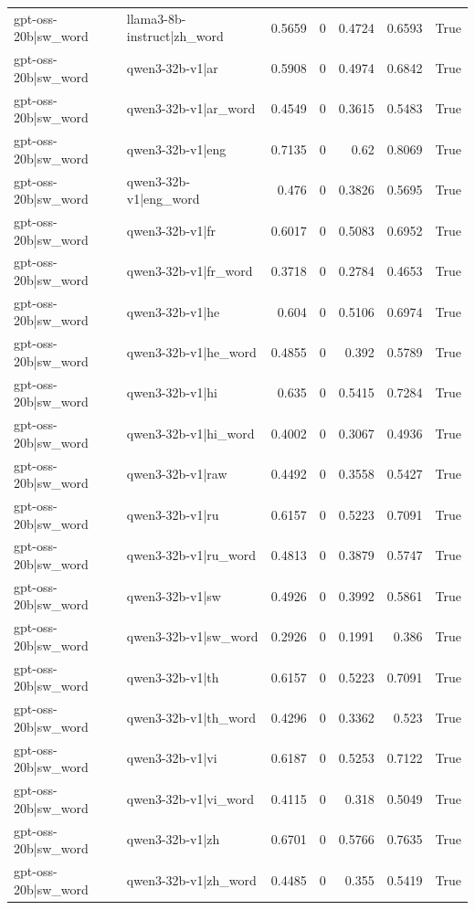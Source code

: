 \begin{table}
\begin{tabular}{l l r r r r l}
gpt-oss-20b|sw_word & llama3-8b-instruct|zh_word & 0.5659 & 0 & 0.4724 & 0.6593 & True \\
gpt-oss-20b|sw_word & qwen3-32b-v1|ar & 0.5908 & 0 & 0.4974 & 0.6842 & True \\
gpt-oss-20b|sw_word & qwen3-32b-v1|ar_word & 0.4549 & 0 & 0.3615 & 0.5483 & True \\
gpt-oss-20b|sw_word & qwen3-32b-v1|eng & 0.7135 & 0 & 0.62 & 0.8069 & True \\
gpt-oss-20b|sw_word & qwen3-32b-v1|eng_word & 0.476 & 0 & 0.3826 & 0.5695 & True \\
gpt-oss-20b|sw_word & qwen3-32b-v1|fr & 0.6017 & 0 & 0.5083 & 0.6952 & True \\
gpt-oss-20b|sw_word & qwen3-32b-v1|fr_word & 0.3718 & 0 & 0.2784 & 0.4653 & True \\
gpt-oss-20b|sw_word & qwen3-32b-v1|he & 0.604 & 0 & 0.5106 & 0.6974 & True \\
gpt-oss-20b|sw_word & qwen3-32b-v1|he_word & 0.4855 & 0 & 0.392 & 0.5789 & True \\
gpt-oss-20b|sw_word & qwen3-32b-v1|hi & 0.635 & 0 & 0.5415 & 0.7284 & True \\
gpt-oss-20b|sw_word & qwen3-32b-v1|hi_word & 0.4002 & 0 & 0.3067 & 0.4936 & True \\
gpt-oss-20b|sw_word & qwen3-32b-v1|raw & 0.4492 & 0 & 0.3558 & 0.5427 & True \\
gpt-oss-20b|sw_word & qwen3-32b-v1|ru & 0.6157 & 0 & 0.5223 & 0.7091 & True \\
gpt-oss-20b|sw_word & qwen3-32b-v1|ru_word & 0.4813 & 0 & 0.3879 & 0.5747 & True \\
gpt-oss-20b|sw_word & qwen3-32b-v1|sw & 0.4926 & 0 & 0.3992 & 0.5861 & True \\
gpt-oss-20b|sw_word & qwen3-32b-v1|sw_word & 0.2926 & 0 & 0.1991 & 0.386 & True \\
gpt-oss-20b|sw_word & qwen3-32b-v1|th & 0.6157 & 0 & 0.5223 & 0.7091 & True \\
gpt-oss-20b|sw_word & qwen3-32b-v1|th_word & 0.4296 & 0 & 0.3362 & 0.523 & True \\
gpt-oss-20b|sw_word & qwen3-32b-v1|vi & 0.6187 & 0 & 0.5253 & 0.7122 & True \\
gpt-oss-20b|sw_word & qwen3-32b-v1|vi_word & 0.4115 & 0 & 0.318 & 0.5049 & True \\
gpt-oss-20b|sw_word & qwen3-32b-v1|zh & 0.6701 & 0 & 0.5766 & 0.7635 & True \\
gpt-oss-20b|sw_word & qwen3-32b-v1|zh_word & 0.4485 & 0 & 0.355 & 0.5419 & True \\

\end{tabular}
\end{table}
